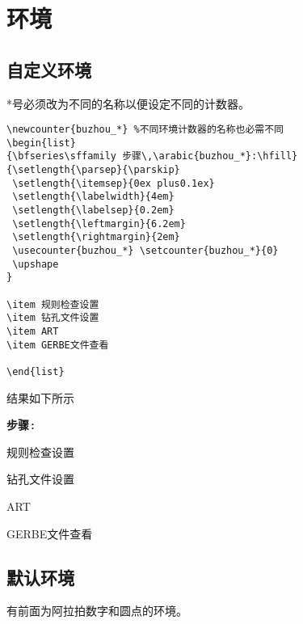 \section{环境}
\subsection{自定义环境}

*号必须改为不同的名称以便设定不同的计数器。
\begin{Verbatim}[formatcom=\color{grass},frame=single]
\newcounter{buzhou_*} %不同环境计数器的名称也必需不同
\begin{list}
{\bfseries\sffamily 步骤\,\arabic{buzhou_*}:\hfill}
{\setlength{\parsep}{\parskip}
 \setlength{\itemsep}{0ex plus0.1ex}
 \setlength{\labelwidth}{4em}
 \setlength{\labelsep}{0.2em}
 \setlength{\leftmargin}{6.2em}
 \setlength{\rightmargin}{2em}
 \usecounter{buzhou_*} \setcounter{buzhou_*}{0}
 \upshape
}

\item 规则检查设置
\item 钻孔文件设置
\item ART
\item GERBE文件查看

\end{list}
\end{Verbatim}


结果如下所示\\
\begin{list}
{\bfseries\sffamily 步骤\,:\hfill}
{\setlength{\parsep}{\parskip}
 \setlength{\itemsep}{0ex plus0.1ex}
 \setlength{\labelwidth}{4em}
 \setlength{\labelsep}{0.2em}
 \setlength{\leftmargin}{6.2em}
 \setlength{\rightmargin}{2em}
  \setcounter{buzhou_test1}{0}
 \upshape
}



\item 规则检查设置
\item 钻孔文件设置
\item ART
\item GERBE文件查看

\end{list}

\subsection{默认环境}
有前面为阿拉拍数字和圆点的环境。

